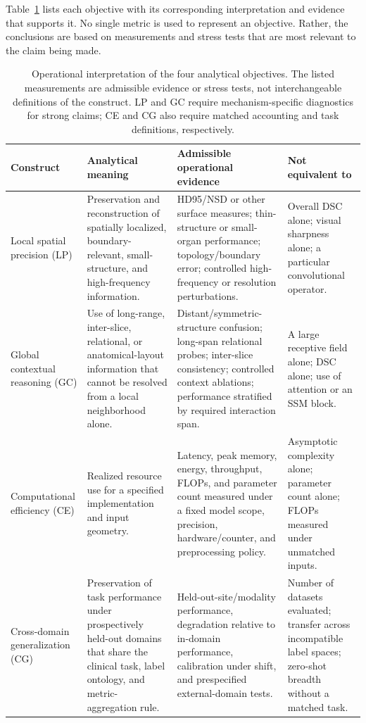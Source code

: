 \documentclass[5p,times,authoryear]{elsarticle}
\begin{document}
Table~\ref{tab:construct_definitions} lists each objective with its corresponding interpretation and evidence that supports it. No single metric is used to represent an objective. Rather, the conclusions are based on measurements and stress tests that are most relevant to the claim being made.

\begin{table}[t]
\centering
\caption{Operational interpretation of the four analytical objectives. The listed measurements are admissible evidence or stress tests, not interchangeable definitions of the construct. LP and GC require mechanism-specific diagnostics for strong claims; CE and CG also require matched accounting and task definitions, respectively.}
\label{tab:construct_definitions}
\footnotesize
\renewcommand{\arraystretch}{1.05}
\setlength{\tabcolsep}{3.0pt}

\begin{tabularx}{\textwidth}{>{\raggedright\arraybackslash}p{2.0cm}>{\raggedright\arraybackslash}p{4.1cm}>{\raggedright\arraybackslash}p{5.8cm}>{\raggedright\arraybackslash}X}
\toprule
\textbf{Construct} & \textbf{Analytical meaning} & \textbf{Admissible operational evidence} & \textbf{Not equivalent to} \\
\midrule
Local spatial precision (LP) & Preservation and reconstruction of spatially localized, boundary-relevant, small-structure, and high-frequency information. & HD95/NSD or other surface measures; thin-structure or small-organ performance; topology/boundary error; controlled high-frequency or resolution perturbations. & Overall DSC alone; visual sharpness alone; a particular convolutional operator. \\
Global contextual reasoning (GC) & Use of long-range, inter-slice, relational, or anatomical-layout information that cannot be resolved from a local neighborhood alone. & Distant/symmetric-structure confusion; long-span relational probes; inter-slice consistency; controlled context ablations; performance stratified by required interaction span. & A large receptive field alone; DSC alone; use of attention or an SSM block. \\
Computational efficiency (CE) & Realized resource use for a specified implementation and input geometry. & Latency, peak memory, energy, throughput, FLOPs, and parameter count measured under a fixed model scope, precision, hardware/counter, and preprocessing policy. & Asymptotic complexity alone; parameter count alone; FLOPs measured under unmatched inputs. \\
Cross-domain generalization (CG) & Preservation of task performance under prospectively held-out domains that share the clinical task, label ontology, and metric-aggregation rule. & Held-out-site/modality performance, degradation relative to in-domain performance, calibration under shift, and prespecified external-domain tests. & Number of datasets evaluated; transfer across incompatible label spaces; zero-shot breadth without a matched task. \\
\bottomrule
\end{tabularx}
\end{table}
\end{document}
